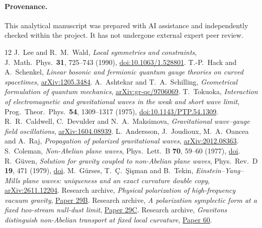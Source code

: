 \documentclass[11pt]{article}
\begin{document}
\paragraph{Provenance.}
This analytical manuscript was prepared with AI assistance
and independently checked within the project. It has not
undergone external expert peer review.

\small
\begin{thebibliography}{12}
\setlength{\itemsep}{2pt}
J.~Lee and R.~M.~Wald, \emph{Local symmetries and constraints},
J.\ Math.\ Phys.\ \textbf{31}, 725--743 (1990),
\href{https://doi.org/10.1063/1.528801}{doi:10.1063/1.528801}.
T.-P.~Hack and A.~Schenkel, \emph{Linear bosonic and fermionic quantum gauge theories on curved spacetimes},
\href{https://arxiv.org/abs/1205.3484}{arXiv:1205.3484}.
A.~Ashtekar and T.~A.~Schilling, \emph{Geometrical formulation of quantum mechanics},
\href{https://arxiv.org/abs/gr-qc/9706069}{arXiv:gr-qc/9706069}.
T.~Tokuoka, \emph{Interaction of electromagnetic and gravitational waves in the weak and short wave limit},
Prog.\ Theor.\ Phys.\ \textbf{54}, 1309--1317 (1975),
\href{https://doi.org/10.1143/PTP.54.1309}{doi:10.1143/PTP.54.1309}.
R.~R.~Caldwell, C.~Devulder and N.~A.~Maksimova,
\emph{Gravitational wave--gauge field oscillations},
\href{https://arxiv.org/abs/1604.08939}{arXiv:1604.08939}.
L.~Andersson, J.~Joudioux, M.~A.~Oancea and A.~Raj,
\emph{Propagation of polarized gravitational waves},
\href{https://arxiv.org/abs/2012.08363}{arXiv:2012.08363}.
S.~Coleman, \emph{Non-Abelian plane waves}, Phys.\ Lett.\ B
\textbf{70}, 59--60 (1977),
\href{https://doi.org/10.1016/0370-2693(77)90344-6}{doi}.
R.~G\"uven, \emph{Solution for gravity coupled to non-Abelian plane waves},
Phys.\ Rev.\ D \textbf{19}, 471 (1979),
\href{https://doi.org/10.1103/PhysRevD.19.471}{doi}.
M.~G\"urses, T.~\c{C}.~\c{S}i\c{s}man and B.~Tekin,
\emph{Einstein--Yang--Mills plane waves: uniqueness and an exact curvature double copy},
\href{https://arxiv.org/abs/2611.12204}{arXiv:2611.12204}.
Research archive, \emph{Physical polarization of high-frequency vacuum gravity},
\href{https://github.com/g3173028019-beep/ai-automated-quantum-gravity-research/tree/main/papers/29b-high-frequency-graviton-polarization}{Paper 29B}.
Research archive, \emph{A polarization symplectic form at a fixed two-stream null-dust limit},
\href{https://github.com/g3173028019-beep/ai-automated-quantum-gravity-research/tree/main/papers/29c-high-frequency-polarization-symplectic-form}{Paper 29C}.
Research archive, \emph{Gravitons distinguish non-Abelian transport at fixed local curvature},
\href{https://github.com/g3173028019-beep/ai-automated-quantum-gravity-research/tree/main/papers/60-graviton-nonabelian-holonomy}{Paper 60}.
\end{thebibliography}
\end{document}
